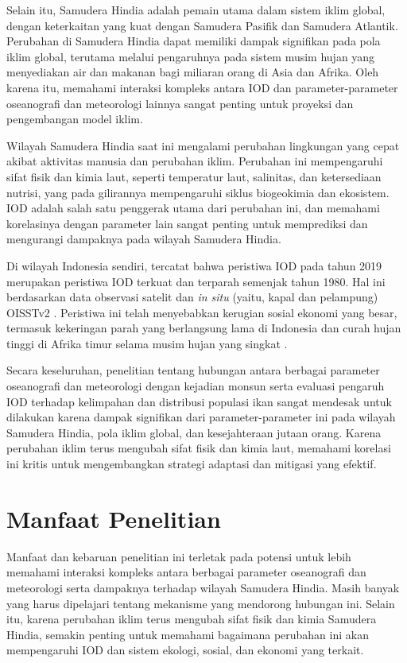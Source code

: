 \begin{spacing}{1.5}
	Selain itu, Samudera Hindia adalah pemain utama dalam sistem iklim global, dengan keterkaitan yang kuat dengan Samudera Pasifik dan Samudera Atlantik. Perubahan di Samudera Hindia dapat memiliki dampak signifikan pada pola iklim global, terutama melalui pengaruhnya pada sistem musim hujan yang menyediakan air dan makanan bagi miliaran orang di Asia dan Afrika. Oleh karena itu, memahami interaksi kompleks antara IOD dan parameter-parameter oseanografi dan meteorologi lainnya sangat penting untuk proyeksi dan pengembangan model iklim.
	
	Wilayah Samudera Hindia saat ini mengalami perubahan lingkungan yang cepat akibat aktivitas manusia dan perubahan iklim. Perubahan ini mempengaruhi sifat fisik dan kimia laut, seperti temperatur laut, salinitas, dan ketersediaan nutrisi, yang pada gilirannya mempengaruhi siklus biogeokimia dan ekosistem. IOD adalah salah satu penggerak utama dari perubahan ini, dan memahami korelasinya dengan parameter lain sangat penting untuk memprediksi dan mengurangi dampaknya pada wilayah Samudera Hindia.

	Di wilayah Indonesia sendiri, tercatat bahwa peristiwa IOD pada tahun 2019 merupakan peristiwa IOD terkuat dan terparah semenjak tahun 1980. Hal ini berdasarkan data observasi satelit dan \textit{in situ} (yaitu, kapal dan pelampung) OISSTv2 \cite{Reynolds2002}. Peristiwa ini telah menyebabkan kerugian sosial ekonomi yang besar, termasuk kekeringan parah yang berlangsung lama di Indonesia dan curah hujan tinggi di Afrika timur selama musim hujan yang singkat \cite{Bo2020}.
	
	Secara keseluruhan, penelitian tentang hubungan antara berbagai parameter oseanografi dan meteorologi dengan kejadian monsun serta evaluasi pengaruh IOD terhadap kelimpahan dan distribusi populasi ikan sangat mendesak untuk dilakukan karena dampak signifikan dari parameter-parameter ini pada wilayah Samudera Hindia, pola iklim global, dan kesejahteraan jutaan orang. Karena perubahan iklim terus mengubah sifat fisik dan kimia laut, memahami korelasi ini kritis untuk mengembangkan strategi adaptasi dan mitigasi yang efektif.
	\section[Manfaat Penelitian]{Manfaat Penelitian}
	
	Manfaat dan kebaruan penelitian ini terletak pada potensi untuk lebih memahami interaksi kompleks antara berbagai parameter oseanografi dan meteorologi serta dampaknya terhadap wilayah Samudera Hindia. Masih banyak yang harus dipelajari tentang mekanisme yang mendorong hubungan ini.
	Selain itu, karena perubahan iklim terus mengubah sifat fisik dan kimia Samudera Hindia, semakin penting untuk memahami bagaimana perubahan ini akan mempengaruhi IOD dan sistem ekologi, sosial, dan ekonomi yang terkait. 
	

\end{spacing}
